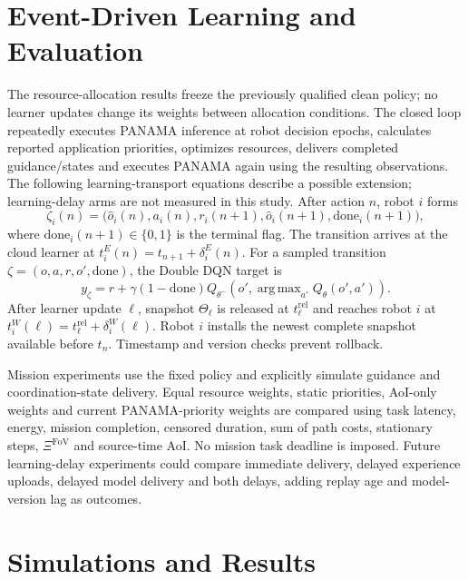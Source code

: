 \IfFileExists{IEEEtran.cls}{\documentclass[conference]{IEEEtran}}{\documentclass[10pt,twocolumn]{article}}
\DeclareMathOperator*{\argmax}{arg\,max}
\begin{document}
\section{Event-Driven Learning and Evaluation}
The resource-allocation results freeze the previously qualified clean policy; no learner updates change its weights between allocation conditions. The closed loop repeatedly executes PANAMA inference at robot decision epochs, calculates reported application priorities, optimizes resources, delivers completed guidance/states and executes PANAMA again using the resulting observations. The following learning-transport equations describe a possible extension; learning-delay arms are not measured in this study.
After action $n$, robot $i$ forms
\begin{equation}
    \zeta_i(n)=\big(\widehat o_i(n),a_i(n),r_i(n+1),
    \widehat o_i(n+1),\mathrm{done}_i(n+1)\big),
\end{equation}
where $\mathrm{done}_i(n+1)\in\{0,1\}$ is the terminal flag. The transition arrives at the cloud learner at $t_i^E(n)=t_{n+1}+\delta_i^E(n)$. For a sampled transition $\zeta=(o,a,r,o',\mathrm{done})$, the Double DQN target is
\begin{equation}
    y_\zeta=r+\gamma(1-\mathrm{done})Q_{\theta^-}
    \left(o',\argmax_{a'}Q_\theta(o',a')\right).
\end{equation}
After learner update $\ell$, snapshot $\Theta_\ell$ is released at $t_\ell^{\mathrm{rel}}$ and reaches robot $i$ at $t_i^W(\ell)=t_\ell^{\mathrm{rel}}+\delta_i^W(\ell)$. Robot $i$ installs the newest complete snapshot available before $t_n$. Timestamp and version checks prevent rollback.

Mission experiments use the fixed policy and explicitly simulate guidance and coordination-state delivery. Equal resource weights, static priorities, AoI-only weights and current PANAMA-priority weights are compared using task latency, energy, mission completion, censored duration, sum of path costs, stationary steps, $\Xi^{\mathrm{FoV}}$ and source-time AoI. No mission task deadline is imposed. Future learning-delay experiments could compare immediate delivery, delayed experience uploads, delayed model delivery and both delays, adding replay age and model-version lag as outcomes.

\section{Simulations and Results}

\end{document}
